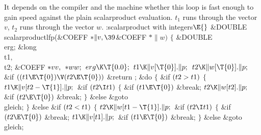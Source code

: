 It depends on the compiler and the machine whether this loop
is fast enough to gain speed against the plain scalarproduct evaluation.
$t_1$ runs through the vector $v$, $t_2$ runs through the vector $w$.
\Y\B\4:scalarproduct with integers\X${}\E{}$\6
\&{DOUBLE} \\{scalarproductlfp}(\&{COEFF} ${}{*}\|v,\39{}$\&{COEFF} ${}{*}%
\|w){}$\1\1\2\2\6
${}\{{}$\1\6
\&{DOUBLE} \\{erg};\6
\&{long} \\{t1}${},{}$ \\{t2};\6
\&{COEFF} ${}{*}\\{vv},{}$ ${}{*}\\{ww};{}$\7
${}\\{erg}\K\T{0.0};{}$\6
${}\\{t1}\K\|v[\T{0}].\|p;{}$\6
${}\\{t2}\K\|w[\T{0}].\|p;{}$\6
\&{if} ${}((\\{t1}\E\T{0})\V(\\{t2}\E\T{0})){}$\1\5
\&{return} ;\2\6
\&{do}\5
${}\{{}$\1\6
\&{if} ${}(\\{t2}>\\{t1}){}$\5
${}\{{}$\1\6
${}\\{t1}\K\|v[\\{t2}-\T{1}].\|p;{}$\6
\&{if} ${}(\\{t2}\I\\{t1}){}$\5
${}\{{}$\1\6
\&{if} ${}(\\{t1}\E\T{0}){}$\1\5
\&{break};\2\6
${}\\{t2}\K\|w[\\{t2}].\|p;{}$\6
\&{if} ${}(\\{t2}\E\T{0}){}$\1\5
\&{break};\2\6
\4${}\}{}$\2\6
\&{else}\1\5
\&{goto} \\{gleich};\2\6
\4${}\}{}$\2\6
\&{else} \&{if} ${}(\\{t2}<\\{t1}){}$\5
${}\{{}$\1\6
${}\\{t2}\K\|w[\\{t1}-\T{1}].\|p;{}$\6
\&{if} ${}(\\{t2}\I\\{t1}){}$\5
${}\{{}$\1\6
\&{if} ${}(\\{t2}\E\T{0}){}$\1\5
\&{break};\2\6
${}\\{t1}\K\|v[\\{t1}].\|p;{}$\6
\&{if} ${}(\\{t1}\E\T{0}){}$\1\5
\&{break};\2\6
\4${}\}{}$\2\6
\&{else}\1\5
\&{goto} \\{gleich};\2\6
